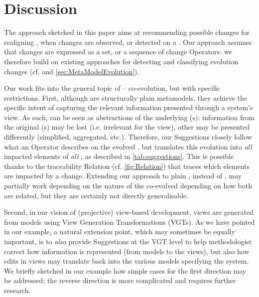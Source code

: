 \section{Discussion}
\label{sec:Discussion}

The approach sketched in this paper aims at recommending possible changes 
for realigning \viewtypes, when changes are observed, or detected on a 
\metamodel. Our approach assumes that \metamodel changes are expressed
as a set, or a sequence of change \textsf{Operator}s: we therefore build
on existing approaches for detecting and classifying evolution changes
(cf. \cite{herrmannsdoerfer_extensive_2011,khelladi_detecting_2015} and  \cref{sec:MetaModelEvolution}).

Our work fits into the general topic of \metamodel{} -- \metamodel co-evolution,
but with specific restrictions. First, although \viewtypes are structurally 
plain metamodels, they achieve the specific intent of capturing the relevant
information presented through a system's view. As such, \viewtypes can
be seen as abstractions of the underlying \metamodel{}(s): information from
the original \metamodel{}(s) may be lost (i.e. irrelevant for the view), other
may be presented differently (simplified, aggregated, etc.). Therefore, our
\textsf{Suggestion}s closely follow what an \textsf{Operator} describes on
the evolved \metamodel, but translates this evolution into \emph{all} impacted
elements of \emph{all} \viewtypes, as described in \cref{tab:suggestions}.
This is possible thanks to the traceability \textsf{Relation} 
(cf. \cref{fig:Relation}) that traces which \viewtype elements are impacted
by a change.
Extending our approach to plain \metamodels, instead of \viewtypes, may partially
work depending on the nature of the co-evolved \metamodels depending on how
both \metamodels are related, but they are certainly not directly generalisable.

Second, in our vision of (projective) view-based development, views are generated
from models using View Generation Transformations (VGTs). As we have pointed in our
example, a natural extension point, which may sometimes be equally important,
is to \emph{also} provide \textsf{Suggestion}s at the VGT level to help 
methodologist correct how information is represented (from models to the views),
but also how edits in views may translate back into the various models specifying
the system. We briefly sketched in our example how simple cases for the first 
direction may be addressed; the reverse direction is more complicated and requires
further research.

